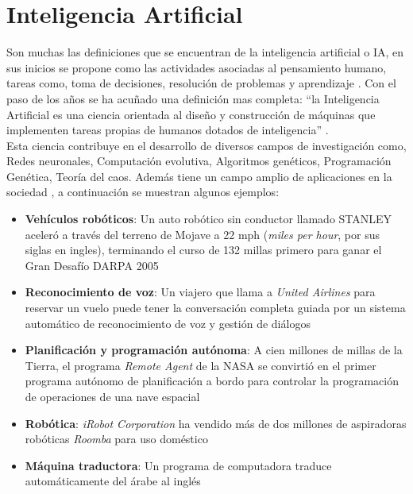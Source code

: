 

\section{Inteligencia Artificial}

Son muchas las definiciones que se encuentran de la inteligencia artificial o IA, en sus inicios se propone como las  actividades asociadas al pensamiento humano, tareas como, toma de decisiones, resolución de problemas y aprendizaje \citep{CT19}. Con el paso de los años se ha acuñado una definición mas completa: ``la Inteligencia Artificial es una ciencia orientada al diseño y construcción de máquinas que implementen tareas propias de humanos dotados de inteligencia'' \citep{CT1}.\\


Esta ciencia contribuye en el desarrollo de diversos campos de investigación como, Redes neuronales, Computación evolutiva, Algoritmos genéticos, Programación Genética, Teoría del caos. Además tiene un campo amplio de aplicaciones en la sociedad \citep{CT20}, a continuación se muestran algunos ejemplos:

\begin{itemize}

	\item \textbf{Vehículos robóticos}: Un auto robótico sin conductor llamado STANLEY aceleró a través del terreno de Mojave a 22 mph (\textit{miles per hour}, por sus siglas en ingles), terminando el curso de 132 millas primero para ganar el Gran Desafío DARPA 2005

	\item \textbf{Reconocimiento de voz}: Un viajero que llama a \textit{United Airlines} para reservar un vuelo puede tener la conversación completa guiada por un sistema automático de reconocimiento de voz y gestión de diálogos

	\item \textbf{Planificación y programación autónoma}: A cien millones de millas de la Tierra, el programa \textit{Remote Agent} de la NASA se convirtió en el primer programa autónomo de planificación a bordo para controlar la programación de operaciones de una nave espacial

	\item \textbf{Robótica}: \textit{iRobot Corporation} ha vendido más de dos millones de aspiradoras robóticas \textit{Roomba} para uso doméstico

	\item \textbf{Máquina traductora}: Un programa de computadora  traduce automáticamente del árabe al inglés

\end{itemize} 
 

